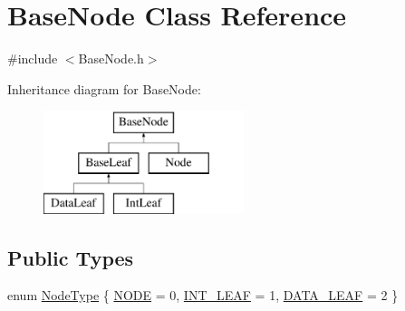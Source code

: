 \hypertarget{class_base_node}{\section{Base\-Node Class Reference}
\label{class_base_node}
}


{\ttfamily \#include $<$Base\-Node.\-h$>$}

Inheritance diagram for Base\-Node\-:\begin{figure}[H]
\begin{center}
\leavevmode
\includegraphics[height=3.000000cm]{class_base_node}
\end{center}
\end{figure}
\subsection*{Public Types}
\begin{DoxyCompactItemize}
\item 
enum \hyperlink{class_base_node_a01f9336072c3fb197a2a0dda45d78544}{Node\-Type} \{ \hyperlink{class_base_node_a01f9336072c3fb197a2a0dda45d78544a528465af535d31fc21605e0c41ac4bc1}{N\-O\-D\-E} = 0, 
\hyperlink{class_base_node_a01f9336072c3fb197a2a0dda45d78544a19c8347aacceaf071d7a9ebada297de3}{I\-N\-T\-\_\-\-L\-E\-A\-F} = 1, 
\hyperlink{class_base_node_a01f9336072c3fb197a2a0dda45d78544a3a9022b38c3db828c6479d21994962c4}{D\-A\-T\-A\-\_\-\-L\-E\-A\-F} = 2
 \}
\end{DoxyCompactItemize}
